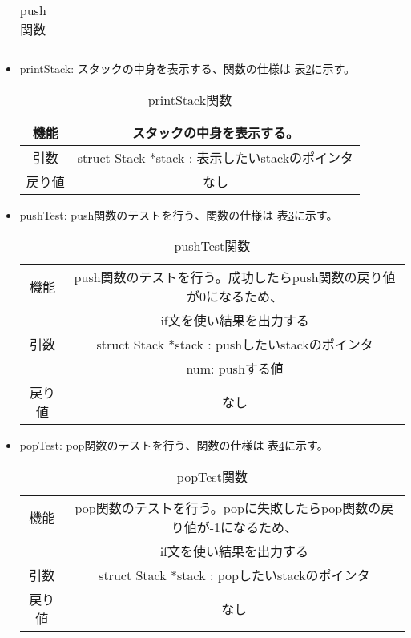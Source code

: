 \documentclass[a4paper,11pt]{jsarticle}
\begin{document}
\begin{itemize}
\begin{table}[ht]
\begin{tabular}{|c|c|}
      \hline
    \end{tabular}
    \caption{push関数}
    \label{tab:push_func}
  \end{table}
  \newpage
  \item printStack: スタックの中身を表示する、関数の仕様は 表\ref{tab:printstack_func}に示す。
  \begin{table}[ht]
    \centering
    \begin{tabular}{|c|c|}
      \hline
      機能  & スタックの中身を表示する。            \\
      \hline
      引数  & struct Stack *stack : 表示したいstackのポインタ \\
      \hline
      戻り値 & なし                               \\
      \hline
    \end{tabular}
    \caption{printStack関数}
    \label{tab:printstack_func}
  \end{table}
  \item pushTest: push関数のテストを行う、関数の仕様は 表\ref{tab:pushtest_func}に示す。
  \begin{table}[ht]
    \centering
    \begin{tabular}{|c|c|}
      \hline
      機能  & push関数のテストを行う。成功したらpush関数の戻り値が0になるため、\\ &if文を使い結果を出力する           \\
      \hline
      引数  & struct Stack *stack : pushしたいstackのポインタ \\
       & num: pushする値 \\
      \hline
      戻り値 & なし                               \\
      \hline
    \end{tabular}
    \caption{pushTest関数}
    \label{tab:pushtest_func}
  \end{table}
  \item popTest: pop関数のテストを行う、関数の仕様は 表\ref{tab:poptest_func}に示す。
  \begin{table}[ht]
    \centering
    \begin{tabular}{|c|c|}
      \hline
      機能  & pop関数のテストを行う。popに失敗したらpop関数の戻り値が-1になるため、\\ & if文を使い結果を出力する            \\
      \hline
      引数  & struct Stack *stack : popしたいstackのポインタ \\
      \hline
      戻り値 & なし                               \\
      \hline
    \end{tabular}
    \caption{popTest関数}
    \label{tab:poptest_func}
  \end{table}
\end{itemize}
\end{document}

